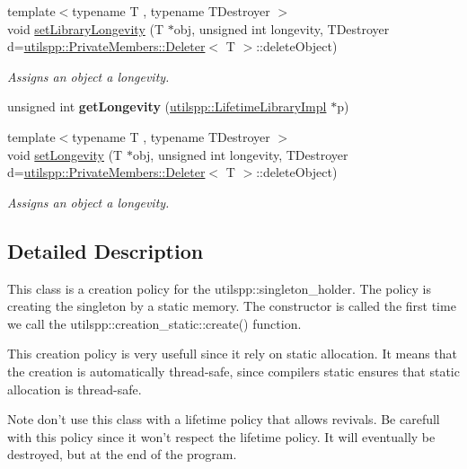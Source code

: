 \begin{DoxyCompactItemize}
\item 
{\footnotesize template$<$typename T , typename T\-Destroyer $>$ }\\void \hyperlink{namespaceutilspp_aef7607a077c455e7503bb2513d8754d8}{set\-Library\-Longevity} (T $\ast$obj, unsigned int longevity, T\-Destroyer d=\hyperlink{structutilspp_1_1PrivateMembers_1_1Deleter}{utilspp\-::\-Private\-Members\-::\-Deleter}$<$ T $>$\-::delete\-Object)
\begin{DoxyCompactList}\small\item\em Assigns an object a longevity. \end{DoxyCompactList}\item 
\hypertarget{namespaceutilspp_ad8fed3e72331ba2a963267b27c089e17}{unsigned int {\bfseries get\-Longevity} (\hyperlink{classutilspp_1_1LifetimeLibraryImpl}{utilspp\-::\-Lifetime\-Library\-Impl} $\ast$p)}\label{namespaceutilspp_ad8fed3e72331ba2a963267b27c089e17}

\item 
{\footnotesize template$<$typename T , typename T\-Destroyer $>$ }\\void \hyperlink{namespaceutilspp_ab604b46da47a6e4f17ae0028e6d09730}{set\-Longevity} (T $\ast$obj, unsigned int longevity, T\-Destroyer d=\hyperlink{structutilspp_1_1PrivateMembers_1_1Deleter}{utilspp\-::\-Private\-Members\-::\-Deleter}$<$ T $>$\-::delete\-Object)
\begin{DoxyCompactList}\small\item\em Assigns an object a longevity. \end{DoxyCompactList}\end{DoxyCompactItemize}


\subsection{Detailed Description}
This class is a creation policy for the utilspp\-::singleton\-\_\-holder. The policy is creating the singleton by a static memory. The constructor is called the first time we call the utilspp\-::creation\-\_\-static\-::create() function.

This creation policy is very usefull since it rely on static allocation. It means that the creation is automatically thread-\/safe, since compilers static ensures that static allocation is thread-\/safe.

Note don't use this class with a lifetime policy that allows revivals. Be carefull with this policy since it won't respect the lifetime policy. It will eventually be destroyed, but at the end of the program.

